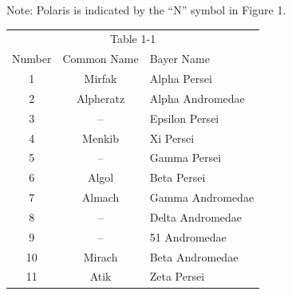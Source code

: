 Note: Polaris is indicated by the ``N'' symbol in Figure 1.

\begin{center}
\begin{tabular}{ccl}
\multicolumn{3}{c}{Table 1-1}\\
Number & Common Name & Bayer Name \\
\hline
1 & Mirfak & Alpha Persei \\
2 & Alpheratz & Alpha Andromedae \\
3 & -- & Epsilon Persei \\
4 & Menkib & Xi Persei \\
5 & -- & Gamma Persei \\
6 & Algol & Beta Persei \\
7 & Almach & Gamma Andromedae \\
8 & -- & Delta Andromedae \\
9 & -- & 51 Andromedae \\
10 & Mirach & Beta Andromedae \\
11 & Atik & Zeta Persei \\
\end{tabular}
\end{center}


